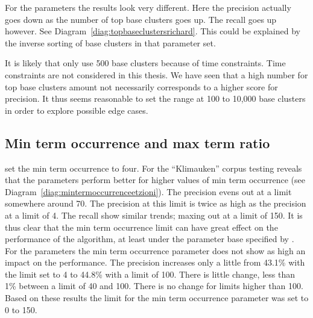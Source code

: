 For the \citeauthor{Moe2013} parameters the results look very different. Here the precision actually goes down as the number of top base clusters goes up. The recall goes up however. See Diagram~\ref{diag:topbaseclustersrichard}. This could be explained by the inverse sorting of base clusters in that parameter set.

It is likely that \citeauthor{Oren1998} only use 500 base clusters because of time constraints. Time constraints are not considered in this thesis. We have seen that a high number for top base clusters amount not necessarily corresponds to a higher score for precision. It thus seems reasonable to set the range at 100 to 10,000 base clusters in order to explore possible edge cases.

\subsection{Min term occurrence and max term ratio}
\citeauthor{Oren1998} set the min term occurrence to four. For the ``Klimauken'' corpus testing reveals that the \citeauthor{Oren1998} parameters perform better for higher values of min term occurrence (see Diagram~\ref{diag:mintermoccurrenceetzioni}). The precision evens out at a limit somewhere around 70. The precision at this limit is twice as high as the precision at a limit of 4. The recall show similar trends; maxing out at a limit of 150. It is thus clear that the min term occurrence limit can have great effect on the performance of the \CTC algorithm, at least under the parameter base specified by \citeauthor{Oren1998}. For the \citeauthor{Moe2013} parameters the min term occurrence parameter does not show as high an impact on the performance. The precision increases only a little from 43.1\% with the limit set to 4 to 44.8\% with a limit of 100. There is little change, less than 1\% between a limit of 40 and 100. There is no change for limits higher than 100. Based on these results the limit for the min term occurrence parameter was set to 0 to 150.

